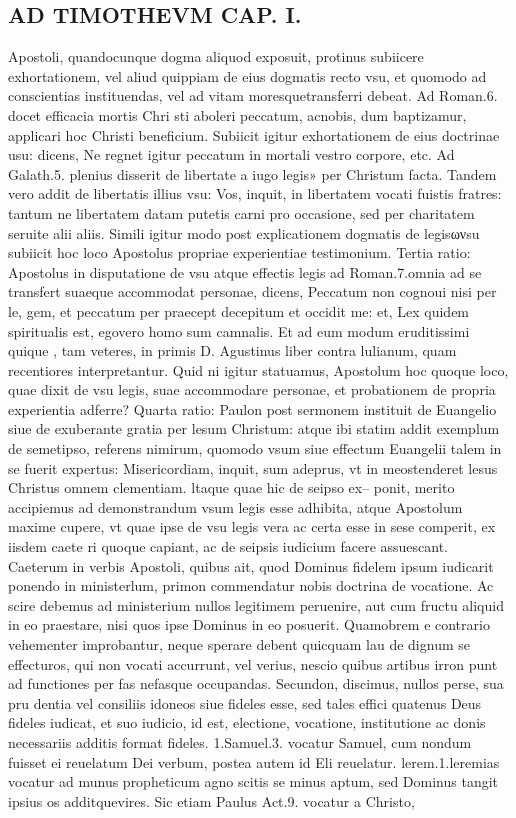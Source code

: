 \documentclass{article}
\begin{document}
\begin{pages}
\section*{AD TIMOTHEVM CAP. I. }
\marginpar{[ p.32 ]}\pstart Apostoli, quandocunque  dogma aliquod exposuit, protinus subiicere exhortationem, vel aliud quippiam de eius dogmatis recto vsu, et quomodo ad conscientias instituendas, vel ad vitam moresquetransferri debeat. Ad Roman.6. docet efficacia mortis Chri sti aboleri peccatum, acnobis, dum baptizamur, applicari hoc Christi beneficium. Subiicit igitur exhortationem de eius doctrinae usu: dicens, Ne regnet igitur peccatum in mortali vestro corpore, etc. Ad Galath.5. plenius disserit de libertate a iugo legis» per Christum facta. Tandem vero addit de libertatis illius vsu: Vos, inquit, in libertatem vocati fuistis fratres: tantum ne libertatem datam putetis carni pro occasione, sed per charitatem seruite alii aliis. Simili igitur modo post explicationem dogmatis de legisωνsu subiicit hoc loco Apostolus propriae experientiae testimonium.  \pend\pstart Tertia ratio: Apostolus in disputatione de vsu atque effectis legis ad Roman.7.omnia ad se transfert suaeque  accommodat personae, dicens, Peccatum non cognoui nisi per le, gem, et peccatum per praecept decepitum et occidit me: et, Lex quidem spiritualis est, egovero homo sum camnalis. Et ad eum modum eruditissimi quique , tam veteres, in primis D. Agustinus liber  contra lulianum, quam recentiores interpretantur. Quid ni igitur statuamus, Apostolum hoc quoque  loco, quae dixit de vsu legis, suae accommodare personae, et probationem de propria experientia adferre?  \pend\pstart Quarta ratio: Paulon post sermonem instituit de Euangelio siue de exuberante gratia per lesum Christum: atque  ibi statim addit exemplum de semetipso, referens nimirum, quomodo vsum siue effectum Euangelii talem in se fuerit expertus: Misericordiam, inquit, sum adeprus, vt in meostenderet lesus Christus omnem clementiam. ltaque  quae hic de seipso ex-- ponit, merito accipiemus ad demonstrandum vsum legis esse adhibita, atque  Apostolum maxime cupere, vt quae ipse de vsu legis vera ac certa esse in sese comperit, ex iisdem caete ri quoque  capiant, ac de seipsis iudicium facere assuescant. Caeterum in verbis Apostoli, quibus ait, quod Dominus fidelem ipsum iudicarit ponendo in ministerlum, primon commendatur nobis doctrina de vocatione. Ac scire debemus ad ministerium nullos legitimem peruenire, aut cum fructu aliquid in eo praestare, nisi quos ipse Dominus in eo posuerit. Quamobrem e contrario vehementer improbantur, neque  sperare debent quicquam lau de dignum se effecturos, qui non vocati accurrunt, vel verius, nescio quibus artibus irron punt ad functiones per fas nefasque  occupandas. Secundon, discimus, nullos perse, sua pru dentia vel consiliis idoneos siue fideles esse, sed tales effici quatenus Deus fideles iudicat, et suo iudicio, id est, electione, vocatione, institutione ac donis necessariis additis format fideles. 1.Samuel.3. vocatur Samuel, cum nondum fuisset ei reuelatum Dei verbum, postea autem id Eli reuelatur. lerem.1.leremias vocatur ad munus propheticum agno scitis se minus aptum, sed Dominus tangit ipsius os additquevires. Sic etiam Paulus Act.9. vocatur a Christo, 
\end{pages}
\end{document}
